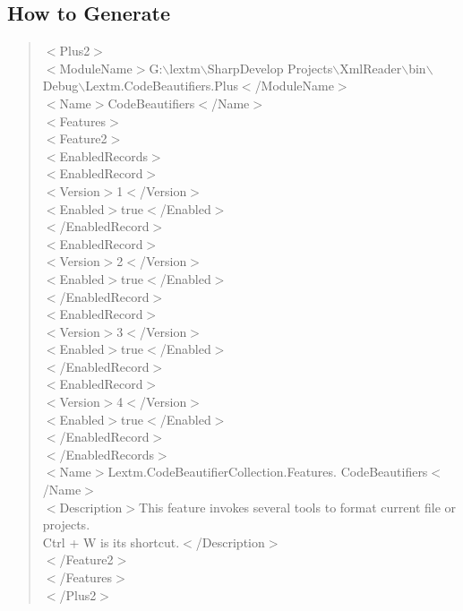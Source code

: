 \subsection{How to Generate}
\begin{quote}
\begin{flushleft}
\begin{sffamily}
$<$Plus2$>$\\
\tab $<$ModuleName$>$G:$\backslash$lextm$\backslash$SharpDevelop
Projects$\backslash$XmlReader$\backslash$bin$\backslash$Debug$\backslash$Lextm.CodeBeautifiers.Plus$<$/ModuleName$>$\\
\tab $<$Name$>$CodeBeautifiers$<$/Name$>$\\
\tab $<$Features$>$\\
\tab \tab $<$Feature2$>$\\
\tab \tab \tab $<$EnabledRecords$>$\\
\tab \tab \tab \tab $<$EnabledRecord$>$\\
\tab \tab \tab \tab \tab $<$Version$>$1$<$/Version$>$\\
\tab \tab \tab \tab \tab $<$Enabled$>$true$<$/Enabled$>$\\
\tab \tab \tab \tab $<$/EnabledRecord$>$\\
\tab \tab \tab \tab $<$EnabledRecord$>$\\
\tab \tab \tab \tab \tab $<$Version$>$2$<$/Version$>$\\
\tab \tab \tab \tab \tab $<$Enabled$>$true$<$/Enabled$>$\\
\tab \tab \tab \tab $<$/EnabledRecord$>$\\
\tab \tab \tab \tab $<$EnabledRecord$>$\\
\tab \tab \tab \tab \tab $<$Version$>$3$<$/Version$>$\\
\tab \tab \tab \tab \tab $<$Enabled$>$true$<$/Enabled$>$\\
\tab \tab \tab \tab $<$/EnabledRecord$>$\\
\tab \tab \tab \tab $<$EnabledRecord$>$\\
\tab \tab \tab \tab \tab $<$Version$>$4$<$/Version$>$\\
\tab \tab \tab \tab \tab $<$Enabled$>$true$<$/Enabled$>$\\
\tab \tab \tab \tab $<$/EnabledRecord$>$\\
\tab \tab \tab $<$/EnabledRecords$>$\\
\tab \tab \tab $<$Name$>$Lextm.CodeBeautifierCollection.Features.
Code\-Beaut\-ifi\-ers$<$/Name$>$\\
\tab \tab \tab $<$Description$>$This feature invokes several tools to format
current file or projects.\\
Ctrl + W is its shortcut.$<$/Description$>$\\
\tab \tab $<$/Feature2$>$\\
\tab $<$/Features$>$\\
$<$/Plus2$>$
\end{sffamily}
\end{flushleft}
\end{quote}

